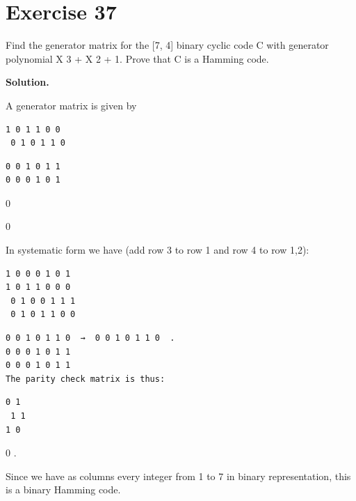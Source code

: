\documentclass[11pt]{article}
\begin{document}
\section*{Exercise 37}
\begin{exercisebox}
Find the generator matrix for the [7, 4] binary cyclic code C with generator polynomial X 3 + X 2 + 1. Prove that C is a Hamming code.

\end{exercisebox}
\begin{solutionbox}
\textbf{Solution.}

A generator matrix is given by

\begin{Verbatim}[fontsize=\small]
1 0 1 1 0 0
 0 1 0 1 1 0
\end{Verbatim}
\begin{Verbatim}[fontsize=\small]
0 0 1 0 1 1
0 0 0 1 0 1
\end{Verbatim}
0

0

In systematic form we have (add row 3 to row 1 and row 4 to row 1,2):

\begin{Verbatim}[fontsize=\small]
1 0 0 0 1 0 1
1 0 1 1 0 0 0
 0 1 0 0 1 1 1
 0 1 0 1 1 0 0
\end{Verbatim}
\begin{Verbatim}[fontsize=\small]
0 0 1 0 1 1 0  →  0 0 1 0 1 1 0  .
0 0 0 1 0 1 1
0 0 0 1 0 1 1
The parity check matrix is thus:
\end{Verbatim}
\begin{Verbatim}[fontsize=\small]
0 1
 1 1
1 0
\end{Verbatim}
0  .

Since we have as columns every integer from 1 to 7 in binary representation, this is a binary Hamming code.

\end{solutionbox}
\end{document}

